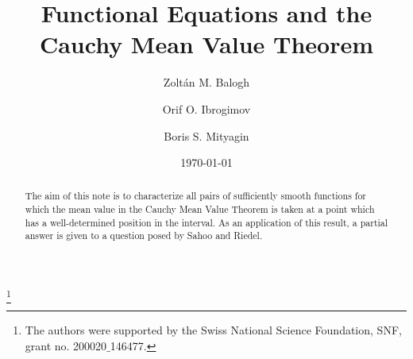 \documentclass{birkjour}
\begin{document}
\title[Functional Equations and the Cauchy Mean Value Theorem]{Functional Equations and the Cauchy Mean Value Theorem}

\author{Zolt\'an M. Balogh}

\address{Institute of Mathematics\\
University of Bern\\
Sidlerstrasse 5\\
CH 3012\\
Switzerland}


\thanks{The authors were supported by the Swiss National Science Foundation,
SNF, grant no. 200020$\_$146477.}

\author{Orif O. Ibrogimov}

\address{Institute of Mathematics\\
University of Bern\\
Sidlerstrasse 5\\
CH 3012\\
Switzerland}

\author{Boris S. Mityagin}

\address{Department of Mathematics\\
The Ohio State University\\
231 W 18th Ave. MW 534\\
Columbus Ohio 43210\\
 U.S.A.}



\date{\today}

\begin{abstract}
The aim of this note is to characterize all pairs of sufficiently smooth functions for which the mean value in the Cauchy Mean Value Theorem is taken at a point which has a well-determined position in the interval. As an application of this  result, a partial answer is given to a question posed by Sahoo and Riedel.
\end{abstract}

\maketitle
\end{document}
